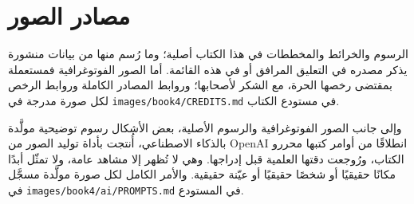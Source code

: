 \chapter*{مصادر الصور}

الرسوم والخرائط والمخططات في هذا الكتاب أصلية؛ وما رُسم منها من بيانات
منشورة يذكر مصدره في التعليق المرافق أو في هذه القائمة. أما الصور
الفوتوغرافية فمستعملة بمقتضى رخصها الحرة، مع الشكر لأصحابها؛ وروابط المصادر
الكاملة وروابط الرخص لكل صورة مدرجة في \texttt{images/book4/CREDITS.md} في
مستودع الكتاب.

\bigskip
وإلى جانب الصور الفوتوغرافية والرسوم الأصلية، بعض الأشكال رسوم توضيحية
مولَّدة بالذكاء الاصطناعي، أُنتجت بأداة توليد الصور من OpenAI انطلاقًا من
أوامر كتبها محررو الكتاب، ورُوجعت دقتها العلمية قبل إدراجها. وهي لا تُظهر
إلا مشاهد عامة، ولا تمثّل أبدًا مكانًا حقيقيًا أو شخصًا حقيقيًا أو عيّنة
حقيقية. والأمر الكامل لكل صورة مولَّدة مسجَّل في
\texttt{images/book4/ai/PROMPTS.md} في المستودع.

